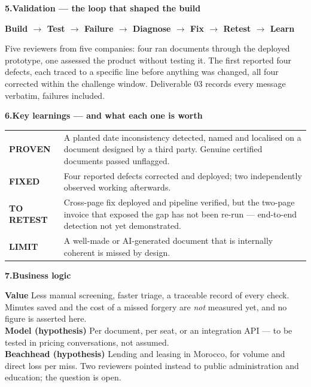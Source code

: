 \documentclass[10pt,a4paper]{article}
\newcommand{\heading}[2]{%
  \par\vspace{5pt}%
  {\color{navy}\bfseries #1\hspace{6pt}#2}%
  \par\vspace{-2pt}%
}
\newcommand{\lead}[1]{\textbf{\color{navy}#1}}
\begin{document}
\heading{5.}{Validation --- the loop that shaped the build}

{\footnotesize\color{steel}\bfseries
Build $\rightarrow$ Test $\rightarrow$ Failure $\rightarrow$ Diagnose
$\rightarrow$ Fix $\rightarrow$ Retest $\rightarrow$ Learn}

\vspace{3pt}
Five reviewers from five companies: four ran documents through the deployed
prototype, one assessed the product without testing it. The first reported four
defects, each
traced to a specific line before anything was changed, all four corrected within
the challenge window. Deliverable 03 records every message verbatim, failures
included.

\heading{6.}{Key learnings --- and what each one is worth}

\vspace{2pt}
\begin{tabular}{@{}>{\raggedright\arraybackslash}p{30mm}
                  >{\raggedright\arraybackslash}p{\dimexpr\linewidth-37mm}@{}}
\rowcolor{zebra}\textbf{\color{good}PROVEN} &
A planted date inconsistency detected, named and localised on a document
designed by a third party. Genuine certified documents passed unflagged. \\[2pt]
\textbf{\color{navy}FIXED} &
Four reported defects corrected and deployed; two independently observed
working afterwards. \\[2pt]
\rowcolor{zebra}\textbf{\color{bad}TO RETEST} &
Cross-page fix deployed and pipeline verified, but the two-page invoice that
exposed the gap has not been re-run --- end-to-end detection not yet
demonstrated. \\[2pt]
\textbf{\color{bad}LIMIT} &
A well-made or AI-generated document that is internally coherent is missed by
design. \\
\end{tabular}

\heading{7.}{Business logic}

\lead{Value} Less manual screening, faster triage, a traceable record of every
check. Minutes saved and the cost of a missed forgery are \emph{not} measured
yet, and no figure is asserted here.\\
\lead{Model \small\color{bad}(hypothesis)} Per document, per seat, or an
integration API --- to be tested in pricing conversations, not assumed.\\
\lead{Beachhead \small\color{bad}(hypothesis)} Lending and leasing in Morocco,
for volume and direct loss per miss. Two reviewers pointed instead to public
administration and education; the question is open.
\end{document}
